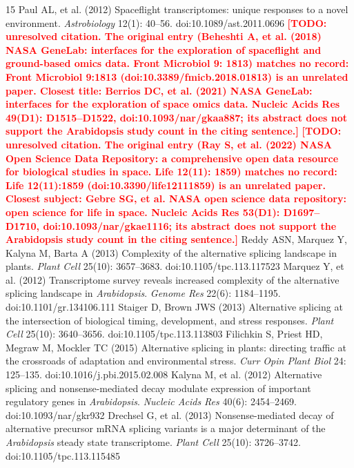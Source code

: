 \documentclass[12pt,a4paper]{article}
\newcommand{\TODO}[1]{\textcolor{red}{\textbf{[TODO: #1]}}}
\begin{document}
\begin{thebibliography}{15}
 Paul AL, et al. (2012) Spaceflight transcriptomes: unique responses to a novel environment. \textit{Astrobiology} 12(1): 40--56. doi:10.1089/ast.2011.0696
 \TODO{unresolved citation. The original entry (Beheshti A, et al. (2018) NASA GeneLab: interfaces for the exploration of spaceflight and ground-based omics data. Front Microbiol 9: 1813) matches no record: Front Microbiol 9:1813 (doi:10.3389/fmicb.2018.01813) is an unrelated paper. Closest title: Berrios DC, et al. (2021) NASA GeneLab: interfaces for the exploration of space omics data. Nucleic Acids Res 49(D1): D1515--D1522, doi:10.1093/nar/gkaa887; its abstract does not support the Arabidopsis study count in the citing sentence.}
 \TODO{unresolved citation. The original entry (Ray S, et al. (2022) NASA Open Science Data Repository: a comprehensive open data resource for biological studies in space. Life 12(11): 1859) matches no record: Life 12(11):1859 (doi:10.3390/life12111859) is an unrelated paper. Closest subject: Gebre SG, et al. NASA open science data repository: open science for life in space. Nucleic Acids Res 53(D1): D1697--D1710, doi:10.1093/nar/gkae1116; its abstract does not support the Arabidopsis study count in the citing sentence.}
 Reddy ASN, Marquez Y, Kalyna M, Barta A (2013) Complexity of the alternative splicing landscape in plants. \textit{Plant Cell} 25(10): 3657--3683. doi:10.1105/tpc.113.117523
 Marquez Y, et al. (2012) Transcriptome survey reveals increased complexity of the alternative splicing landscape in \textit{Arabidopsis}. \textit{Genome Res} 22(6): 1184--1195. doi:10.1101/gr.134106.111
 Staiger D, Brown JWS (2013) Alternative splicing at the intersection of biological timing, development, and stress responses. \textit{Plant Cell} 25(10): 3640--3656. doi:10.1105/tpc.113.113803
 Filichkin S, Priest HD, Megraw M, Mockler TC (2015) Alternative splicing in plants: directing traffic at the crossroads of adaptation and environmental stress. \textit{Curr Opin Plant Biol} 24: 125--135. doi:10.1016/j.pbi.2015.02.008
 Kalyna M, et al. (2012) Alternative splicing and nonsense-mediated decay modulate expression of important regulatory genes in \textit{Arabidopsis}. \textit{Nucleic Acids Res} 40(6): 2454--2469. doi:10.1093/nar/gkr932
 Drechsel G, et al. (2013) Nonsense-mediated decay of alternative precursor mRNA splicing variants is a major determinant of the \textit{Arabidopsis} steady state transcriptome. \textit{Plant Cell} 25(10): 3726--3742. doi:10.1105/tpc.113.115485

\end{thebibliography}
\end{document}
